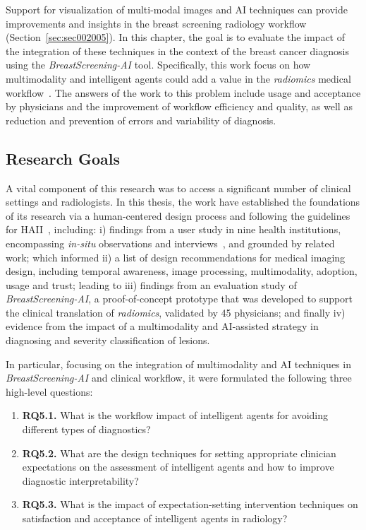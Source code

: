 Support for visualization of multi-modal images and \ac{AI} techniques can provide improvements and insights in the breast screening radiology workflow (Section~\ref{sec:sec002005}).
In this chapter, the goal is to evaluate the impact of the integration of these techniques in the context of the breast cancer diagnosis using the {\it BreastScreening-AI} tool.
Specifically, this work focus on how multimodality and intelligent agents could add a value in the {\it radiomics} medical workflow~\cite{calisto2017mimbcdui}.
The answers of the work to this problem include usage and acceptance by physicians and the improvement of workflow efficiency and quality, as well as reduction and prevention of errors and variability of diagnosis.

\subsection{Research Goals}
\label{sec:sec005001002}

A vital component of this research was to access a significant number of clinical settings and radiologists.
In this thesis, the work have established the foundations of its research via a human-centered design process and following the guidelines for \ac{HAII}~\cite{10.1145/3290605.3300233, Cai:2019:HTC:3290605.3300234, Kocielnik:2019:YAI:3290605.3300641}, including:
i) findings from a user study in nine health institutions, encompassing {\it in-situ} observations and interviews~\cite{Sarcevic:2012:TET:2240156.2240161, Lim:2019:DDI:3319806.3301427}, and grounded by related work; which informed
ii) a list of design recommendations for medical imaging design, including temporal awareness, image processing, multimodality, adoption, usage and trust; leading to
iii) findings from an evaluation study of {\it BreastScreening-AI}, a proof-of-concept prototype that was developed to support the clinical translation of {\it radiomics}, validated by 45 physicians; and finally
iv) evidence from the impact of a multimodality and \ac{AI}-assisted strategy in diagnosing and severity classification of lesions.

\hfill

\noindent
In particular, focusing on the integration of multimodality and \ac{AI} techniques in {\it BreastScreening-AI} and clinical workflow, it were formulated the following three high-level questions:

\begin{enumerate}
\item {\bf RQ5.1.} What is the workflow impact of intelligent agents for avoiding different types of diagnostics?
\item {\bf RQ5.2.} What are the design techniques for setting appropriate clinician expectations on the assessment of intelligent agents and how to improve diagnostic interpretability?
\item {\bf RQ5.3.} What is the impact of expectation-setting intervention techniques on satisfaction and acceptance of intelligent agents in radiology?
\end{enumerate}

